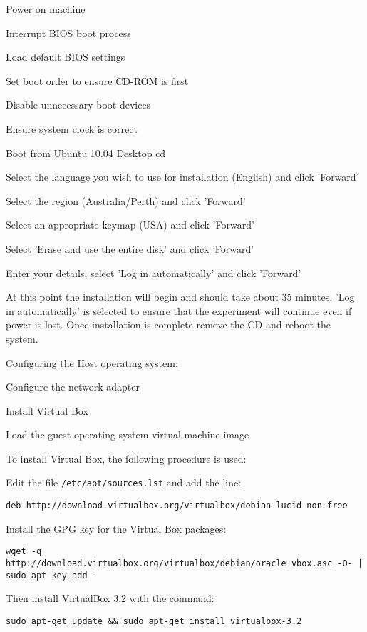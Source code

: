\begin{enumerate*}
  \item Power on machine
  \item Interrupt BIOS boot process
  \begin{enumerate*}
    \item Load default BIOS settings
    \item Set boot order to ensure CD-ROM is first
    \item Disable unnecessary boot devices
    \item Ensure system clock is correct
  \end{enumerate*}
  \item Boot from Ubuntu 10.04 Desktop cd
  \item Select the language you wish to use for installation (English) and click 'Forward'
  \item Select the region (Australia/Perth) and click 'Forward'
  \item Select an appropriate keymap (USA) and click 'Forward'
  \item Select 'Erase and use the entire disk' and click 'Forward'
  \item Enter your details, select 'Log in automatically' and click 'Forward'
\end{enumerate*}

At this point the installation will begin and should take about 35 minutes.
'Log in automatically' is selected to ensure that the experiment will continue
even if power is lost. Once installation is complete remove the CD and reboot
the system.

Configuring the Host operating system:

\begin{enumerate*}
  \item Configure the network adapter
  \item Install Virtual Box
  \item Load the guest operating system virtual machine image
\end{enumerate*}

To install Virtual Box, the following procedure is used:

\begin{enumerate*}
  \item Edit the file \verb+/etc/apt/sources.lst+ and add the line:
  \begin{verbatim}
deb http://download.virtualbox.org/virtualbox/debian lucid non-free
  \end{verbatim}
  \item Install the GPG key for the Virtual Box packages:
  \begin{verbatim}
wget -q http://download.virtualbox.org/virtualbox/debian/oracle_vbox.asc -O- | sudo apt-key add -
  \end{verbatim}
  \item Then install VirtualBox 3.2 with the command:
  \begin{verbatim}
sudo apt-get update && sudo apt-get install virtualbox-3.2
  \end{verbatim}
\end{enumerate*}

